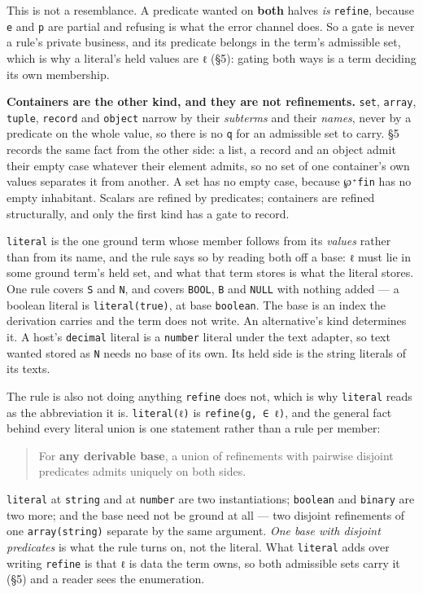 This is not a resemblance. A predicate wanted on \textbf{both} halves \emph{is} \texttt{refine}, because \texttt{e} and \texttt{p}
are partial and refusing is what the error channel does. So a gate is never a rule's private
business, and its predicate belongs in the term's admissible set, which is why a literal's held
values are \texttt{ℓ} (§5): gating both ways is a term deciding its own membership.

\textbf{Containers are the other kind, and they are not refinements.} \texttt{set}, \texttt{array}, \texttt{tuple}, \texttt{record}
and \texttt{object} narrow by their \emph{subterms} and their \emph{names}, never by a predicate on the whole value,
so there is no \texttt{q} for an admissible set to carry. §5 records the same fact from the other side: a
list, a record and an object admit their empty case whatever their element admits, so no set of one
container's own values separates it from another. A set has no empty case, because \texttt{℘⁺fin} has no
empty inhabitant. Scalars are refined by predicates; containers are refined structurally, and only the first kind
has a gate to record.

\texttt{literal} is the one ground term whose member follows from its \emph{values} rather than from its name,
and the rule says so by reading both off a base: \texttt{ℓ} must lie in some ground term's held set, and
what that term stores is what the literal stores. One rule covers \texttt{S} and \texttt{N}, and covers \texttt{BOOL},
\texttt{B} and \texttt{NULL} with nothing added — a boolean literal is \texttt{literal(true)}, at base \texttt{boolean}. The
base is an index the derivation carries and the term does not write. An alternative's kind determines
it. A host's \texttt{decimal} literal is a \texttt{number} literal under the text adapter, so text wanted stored as
\texttt{N} needs no base of its own. Its held side is the string literals of its texts.

The rule is also not doing anything \texttt{refine} does not, which is why \texttt{literal}
reads as the abbreviation it is. \texttt{literal(ℓ)} is \texttt{refine(g,\ ∈\ ℓ)}, and the general fact behind every
literal union is one statement rather than a rule per member:

\begin{quote}
For \textbf{any derivable base}, a union of refinements with pairwise disjoint predicates admits
uniquely on both sides.
\end{quote}

\texttt{literal} at \texttt{string} and at \texttt{number} are two instantiations; \texttt{boolean} and \texttt{binary} are two more;
and the base need not be ground at all — two disjoint refinements of one \texttt{array(string)} separate by
the same argument. \emph{One base with disjoint predicates} is what the rule turns on, not the
literal.
What \texttt{literal} adds over writing \texttt{refine} is that \texttt{ℓ} is data the term owns, so both admissible
sets carry it (§5) and a reader sees the enumeration.

